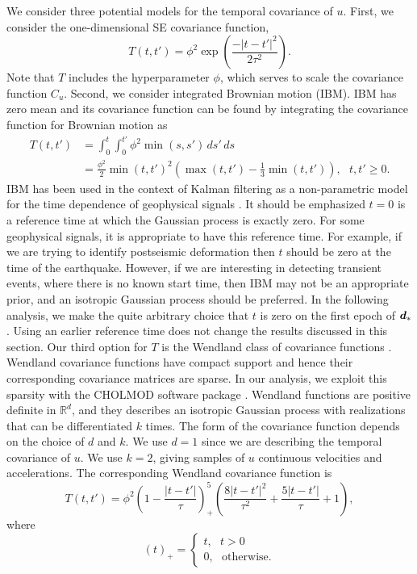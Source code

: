 \documentclass[extra,mreferee]{gji}
\begin{document}
We consider three potential models for the temporal covariance of $u$.
First, we consider the one-dimensional SE covariance function,
\begin{equation}\label{eq:TimeSE}
T(t,t') = \phi^2\exp\left(\frac{-|t - t'|^2}{2\tau^2}\right).
\end{equation}
Note that $T$ includes the hyperparameter $\phi$, which serves to
scale the covariance function $C_u$. Second, we consider integrated
Brownian motion (IBM). IBM has zero mean and its covariance function
can be found by integrating the covariance function for Brownian
motion as
\begin{align}\label{eq:IBM}
T(t,t') &= \int_0^t \int_0^{t'} \phi^2 \min(s,s') \,ds'\,ds \\
        &= \frac{\phi^2}{2}\min(t,t')^2 \left(\max(t,t') - \frac{1}{3}\min(t,t')\right), \ \ \ t,t' \geq 0.
\end{align}
IBM has been used in the context of Kalman filtering as a
non-parametric model for the time dependence of geophysical signals
\citep[e.g.,][]{Segall1997, McGuire2003, Ohtani2010, Hines2016a}. It
should be emphasized $t=0$ is a reference time at which the Gaussian
process is exactly zero. For some geophysical signals, it is
appropriate to have this reference time. For example, if we are trying
to identify postseismic deformation then $t$ should be zero at the
time of the earthquake.  However, if we are interesting in detecting
transient events, where there is no known start time, then IBM may not
be an appropriate prior, and an isotropic Gaussian process should be
preferred. In the following analysis, we make the quite arbitrary
choice that $t$ is zero on the first epoch of $\data_*$. Using an
earlier reference time does not change the results discussed in this
section. Our third option for $T$ is the Wendland class of covariance
functions \citep{Wendland2005}. Wendland covariance functions have
compact support and hence their corresponding covariance matrices are
sparse. In our analysis, we exploit this sparsity with the CHOLMOD
software package \citep{Chen2008}. Wendland functions are positive
definite in $\mathbb{R}^d$, and they describes an isotropic Gaussian
process with realizations that can be differentiated $k$ times. The
form of the covariance function depends on the choice of $d$ and $k$.
We use $d=1$ since we are describing the temporal covariance of $u$.
We use $k=2$, giving samples of $u$ continuous velocities and
accelerations. The corresponding Wendland covariance function is
\begin{equation}\label{eq:Wendland}
T(t,t') = \phi^2\left(1 - \frac{|t - t'|}{\tau}\right)^5_+ \left(\frac{8|t - t'|^2}{\tau^2} + \frac{5|t - t'|}{\tau} + 1\right), 
\end{equation}
where
\begin{equation}
(t)_+ = 
\begin{cases}
t, \ \ \ t > 0 \\
0, \ \ \ \mathrm{otherwise}.
\end{cases}
\end{equation}
\end{document}
